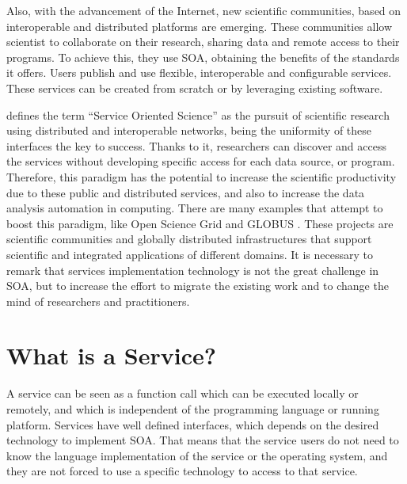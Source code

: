 Also, with the advancement of the Internet, new scientific communities, based on interoperable and distributed platforms are emerging. These communities allow scientist to collaborate on their research, sharing data and remote access to their programs. To achieve this, they use SOA, obtaining the benefits of the standards it offers. Users publish and use flexible, interoperable and configurable services. These services can be created from scratch or by leveraging existing software. 

 \cite{Foster2005Science} defines the term ``Service Oriented
Science'' as the pursuit of scientific research using distributed and
interoperable networks, being the uniformity of
these interfaces the key to success. Thanks to it, researchers can discover and access
the services without developing specific access for each data source, or
program. Therefore, this paradigm has the potential to increase the
scientific productivity due to these public and distributed services, and also to increase the data analysis automation in computing. There are many examples that attempt to boost this paradigm, like Open Science Grid \citep{Altunay2011OpenScience} and GLOBUS \citep{Foster2005Globus}. These projects are scientific communities and globally distributed infrastructures that support scientific and integrated applications of different domains.
It is necessary to remark that services implementation technology is not the
great challenge in SOA, but to increase the effort to migrate the
existing work and to change the mind of researchers and
practitioners. 

\section{What is a Service?}

\lettrine{A}{} service can be seen as a function call which can be executed locally or remotely, and which is independent of the programming language or running platform. Services have well defined interfaces, which depends on the desired technology to implement SOA. That means that the service users do not need to know the language implementation of the service or the operating system, and they are not forced to use a specific technology to access to that service.

